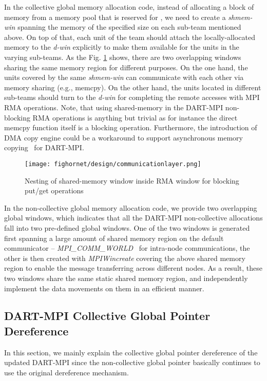 \documentclass{llncs}
\begin{document}
{In the collective global memory allocation code, instead of allocating a block of memory 
from a memory pool that is reserved for , we need to create a \mbox{\textit{shmem-win}} spanning the 
memory of the specified size on each sub-team mentioned above.
On top of that, each unit of the team  should attach the locally-allocated memory
to the \mbox{\textit{d-win}} explicitly to make them available for the units in the varying \mbox{sub-teams}. As the 
Fig. \ref{structure} shows, there are two overlapping windows sharing the same memory region for different purposes.
On the one hand, the units covered by the same \mbox{\textit{shmem-win}} can communicate with each other via
memory sharing (e.g., memcpy). On the other hand, the units located in different \mbox{sub-teams} should turn to the \mbox{\textit{d-win}} for
completing the remote accesses with MPI RMA operations.
Note, that using shared-memory in the 
DART-MPI non-blocking RMA operations is anything but trivial as for instance the direct memcpy function itself 
is a blocking operation. Furthermore, the introduction of DMA copy engine could be a workaround to support 
asynchronous memory copying~\cite{async} for DART-MPI. 

\begin{figure}[tb]
\begin{center}
\texttt{[image: fighornet/design/communicationlayer.png]}
\end{center} 
\caption{Nesting of shared-memory window inside RMA window for blocking put/get operations}
\label{structure}
\end{figure}

In the \mbox{non-collective} global memory allocation code, we provide two overlapping global 
windows, 
which indicates that all the \mbox{DART-MPI} \mbox{non-collective} 
allocations fall into two \mbox{pre-defined} global windows. 
One of the two windows is generated first spanning a large amount of shared memory region 
on the default communicator -- {\em MPI\_COMM\_WORLD}~\cite{mpi3} for intra-node 
communications, the other is
then created with {\em MPIWincreate} covering the above
shared memory region to enable the message transferring across different nodes. As a result,
these two windows share the same static shared memory region, and independently 
implement the data movements on them in an efficient manner.
\subsection{DART-MPI Collective Global Pointer Dereference}
In this section, we 
mainly explain the collective global pointer dereference of 
the updated \mbox{DART-MPI} since the \mbox{non-collective} global 
pointer basically continues to use the original dereference mechanism.

}
\end{document}
